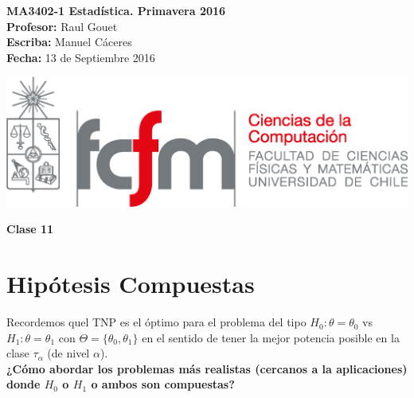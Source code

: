 \documentclass[10pt]{article}
\theoremstyle{plain}
\theoremstyle{definition}
\newcommand{\catnum}{11} %
\newcommand{\fecha}{13 de Septiembre 2016 }
\begin{document}
\vspace*{-1.2 cm}
\begin{minipage}{0.6\textwidth}
\begin{flushleft}
\hspace*{-0.5cm}\textbf{MA3402-1 Estadística. Primavera 2016}\\
\hspace*{-0.5cm}\textbf{Profesor:} Raul Gouet\\
\hspace*{-0.5cm}\textbf{Escriba:} Manuel Cáceres\\
\hspace*{-0.5cm}\textbf{Fecha:} \fecha
\end{flushleft}
\end{minipage}
\begin{minipage}{0.36\textwidth}
\begin{flushright}
\includegraphics[scale=0.3]{imagenes/fcfm_dcc}
\end{flushright}
\end{minipage}
\bigskip

\begin{center}
\LARGE\textbf{Clase \catnum}
\end{center}
\section{Hipótesis Compuestas}
Recordemos quel TNP es el óptimo para el problema del tipo $H_{0}: \theta = \theta_{0}$ vs $H_{1}: \theta = \theta_{1}$ con $\Theta = \{\theta_{0}, \theta_{1}\}$ en el sentido de tener la mejor potencia posible en la clase $\tau_{\alpha}$ (de nivel $\alpha$).\\
	
\textbf{¿Cómo abordar los problemas más realistas (cercanos a la aplicaciones) donde $H_{0}$ o $H_{1}$ o ambos son compuestas?}\\
\end{document}
